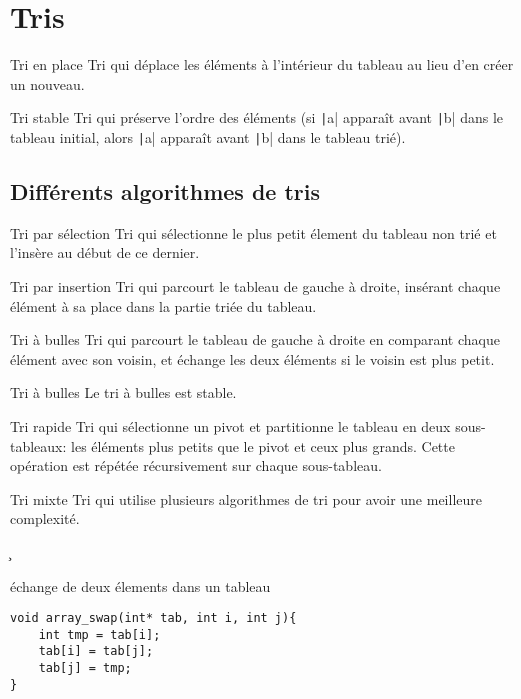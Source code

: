 \section{Tris}
\begin{df*}{Tri en place}
Tri qui déplace les éléments à l'intérieur du tableau au lieu d'en créer un nouveau.
\end{df*}
\begin{df*}{Tri stable}
Tri qui préserve l'ordre des éléments (si \texttt|a| apparaît avant \texttt|b| dans le tableau initial, alors \texttt|a| apparaît avant \texttt|b| dans le tableau trié).
\end{df*}
\subsection{Différents algorithmes de tris}
\begin{df*}{Tri par sélection}
Tri qui sélectionne le plus petit élement du tableau non trié et l'insère au début de ce dernier.
\end{df*}
\begin{df*}{Tri par insertion}
Tri qui parcourt le tableau de gauche à droite, insérant chaque élément à sa place dans la partie triée du tableau.
\end{df*}
\begin{df*}{Tri à bulles}
Tri qui parcourt le tableau de gauche à droite en comparant chaque élément avec son voisin, et échange les deux éléments si le voisin est plus petit.
\end{df*}
\begin{pt*}{Tri à bulles}
Le tri à bulles est stable.
\end{pt*}
\begin{df*}{Tri rapide}
Tri qui sélectionne un pivot et partitionne le tableau en deux sous-tableaux: les éléments plus petits que le pivot et ceux plus grands. Cette opération est répétée récursivement sur chaque sous-tableau.
\end{df*}
\begin{df*}{Tri mixte}
Tri qui utilise plusieurs algorithmes de tri pour avoir une meilleure complexité.
\end{df*}
\c
\begin{fnc*}{échange de deux élements dans un tableau}
\begin{verbatim}
void array_swap(int* tab, int i, int j){
    int tmp = tab[i];
    tab[i] = tab[j];
    tab[j] = tmp;
}
\end{verbatim}
\end{fnc*}
